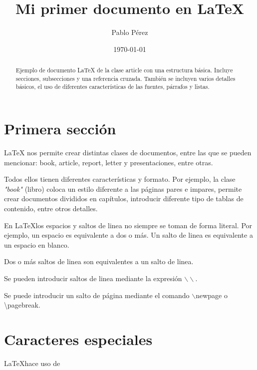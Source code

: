 \documentclass[letterpaper,11pt]{article}
\title{Mi primer documento en \LaTeX{}}
\author{Pablo Pérez}
\date{\today{}}
\begin{document}
\thispagestyle{empty}

\maketitle

\tableofcontents

\newpage

\begin{abstract}
Ejemplo de documento \LaTeX{} de la clase {\ttfamily article} con una estructura básica. 
Incluye secciones, subsecciones y una referencia cruzada. También se incluyen varios detalles básicos, el uso de diferentes características de las fuentes, párrafos y listas.
\end{abstract}

\section{Primera sección}\label{primera}

\LaTeX{} nos permite crear distintas clases de documentos, entre las que se pueden mencionar: book, article, report, letter y presentaciones, entre otras.

Todos ellos tienen diferentes características y formato. Por ejemplo, la clase \textit{"book"} (libro) coloca un estilo diferente a las páginas pares e impares, permite crear documentos divididos en capítulos, introducir diferente  tipo de tablas de contenido, entre otros detalles.





En \LaTeX los espacios y saltos de linea no siempre se toman de forma literal.
Por ejemplo, un espacio        es      equivalente a      dos o más. 
Un salto de linea es equivalente a un espacio en blanco.

Dos o más saltos de linea son equivalentes a un salto de linea.

Se pueden introducir saltos de linea mediante la expresión $\backslash\backslash$.

Se puede introducir un salto de página mediante el comando $\backslash$newpage o \textbackslash pagebreak.

\section{Caracteres especiales}

\LaTeX hace uso de
\end{document}
